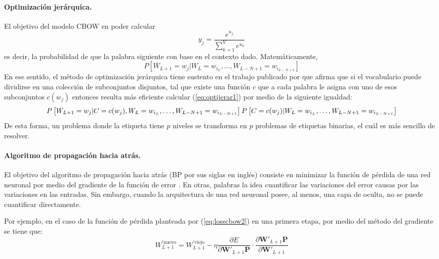 \paragraph{Optimización jerárquica.} El objetivo del modelo CBOW en poder calcular
\begin{equation}
	y_j = \frac{e^{u_j}}{\sum_{k=1}^{V}e^{u_k}} 
\end{equation}
es decir, la probabilidad de que la palabra siguiente con base en el contexto dado. Matemáticamente,
\begin{equation}
	\label{eq:optijerar1}
	P\left[W_{L+1} = w_j \vert W_{L}=w_{i_{L}},\ldots,W_{L-N+1}=w_{i_{L-N+1}}\right]
\end{equation} 
En ese sentido, el método de optimización jerárquica tiene sustento en el trabajo publicado por \cite{morin2005hierarchical} que afirma que si el vocabulario puede dividirse en una colección de subconjuntos disjuntos, tal que existe una función $c$ que a cada palabra le asigna con uno de esos subconjuntos $c\left(w_j\right)$ entonces resulta más eficiente calcular (\ref{eq:optijerar1}) por medio de la siguiente igualdad:
\begin{equation}
	\tiny
	 P\left[W_{L+1} = w_j | C = c(w_j), W_{L}=w_{i_{L}},\ldots,W_{L-N+1}=w_{i_{L-N+1}}\right]P\left[C=c(w_j)|W_{L}=w_{i_{L}},\ldots,W_{L-N+1}=w_{i_{L-N+1}}\right]
\end{equation}
De esta forma, un problema donde la etiqueta tiene $p$ niveles se transforma en $p$ problemas de etiquetas binarias, el cuál es más sencillo de resolver.

\paragraph{Algoritmo de propagación hacia atrás.} El objetivo del algoritmo de propagación hacia atrás (BP por sus siglas en inglés) consiste en minimizar la función de pérdida de una red neuronal por medio del gradiente de la función de error \citep{rojas1996backpropagation}. En otras, palabras la idea cuantificar las variaciones del error causas por las variaciones en las entradas.  Sin embargo, cuando la arquitectura de una red neuronal posee, al menos, una capa de oculta, no se puede cuantificar directamente. 

Por ejemplo, en el caso de la función de pérdida planteada por (\ref{eq:losscbow2}) en una primera etapa, por medio del método del gradiente se tiene que:
\begin{equation}
	W_{L+1}^{'\mbox{nuevo}} = W_{L+1}^{'\mbox{viejo}} - \eta \frac{\partial E}{\partial \mathbf{W}'_{L+1}\mathbf{P}} \cdot \frac{\partial \mathbf{W}'_{L+1}\mathbf{P}}{\partial \mathbf{W}'_{L+1}}
\end{equation}

